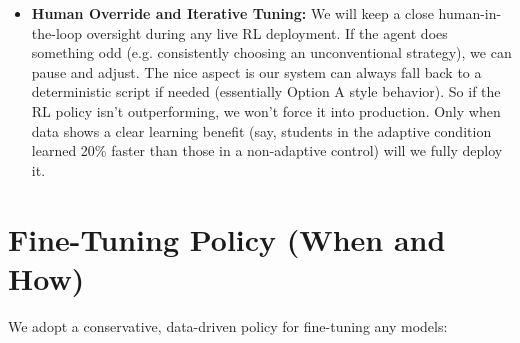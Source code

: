 \documentclass[11pt]{article}
\begin{document}
\begin{itemize}
  \item \textbf{Human Override and Iterative Tuning:} We will keep a close human-in-the-loop oversight during any live RL deployment. If the agent does something odd (e.g. consistently choosing an unconventional strategy), we can pause and adjust. The nice aspect is our system can always fall back to a deterministic script if needed (essentially Option A style behavior). So if the RL policy isn’t outperforming, we won’t force it into production. Only when data shows a clear learning benefit (say, students in the adaptive condition learned 20\% faster than those in a non-adaptive control) will we fully deploy it.
\end{itemize}

\section{Fine-Tuning Policy (When and How)}
We adopt a conservative, data-driven policy for fine-tuning any models:
\end{document}
